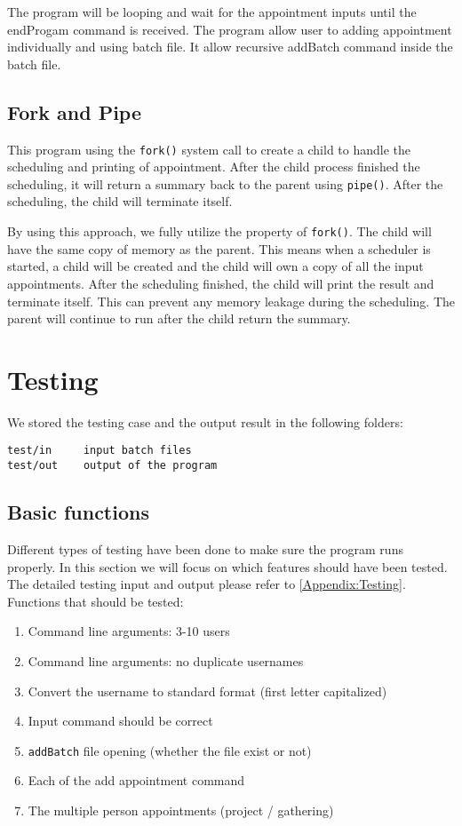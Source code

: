 \documentclass[12pt,a4paper]{report}
\begin{document}
The program will be looping and wait for the appointment inputs until the endProgam command is received. The program allow user to adding appointment individually and using batch file. It allow recursive addBatch command inside the batch file.

\section{Fork and Pipe}
This program using the \texttt{fork()} system call to create a child to handle the scheduling and printing of appointment. After the child process finished the scheduling, it will return a summary back to the parent using \texttt{pipe()}. After the scheduling, the child will terminate itself.

By using this approach, we fully utilize the property of \texttt{fork()}. The child will have the same copy of memory as the parent. This means when a scheduler is started, a child will be created and the child will own a copy of all the input appointments. After the scheduling finished, the child will print the result and terminate itself. This can prevent any memory leakage during the scheduling. The parent will continue to run after the child return the summary.

\chapter{Testing}
We stored the testing case and the output result in the following folders:
\begin{verbatim}
test/in     input batch files
test/out    output of the program
\end{verbatim}
\section{Basic functions}
Different types of testing have been done to make sure the program runs properly. In this section we will focus on which features should have been tested. The detailed testing input and output please refer to \autoref{Appendix:Testing}.
Functions that should be tested:
\begin{enumerate}
\item Command line arguments: 3-10 users
\item Command line arguments: no duplicate usernames
\item Convert the username to standard format (first letter capitalized)
\item Input command should be correct
\item \texttt{addBatch} file opening (whether the file exist or not)
\item Each of the add appointment command
\item The multiple person appointments (project / gathering)
\end{enumerate}
\end{document}
